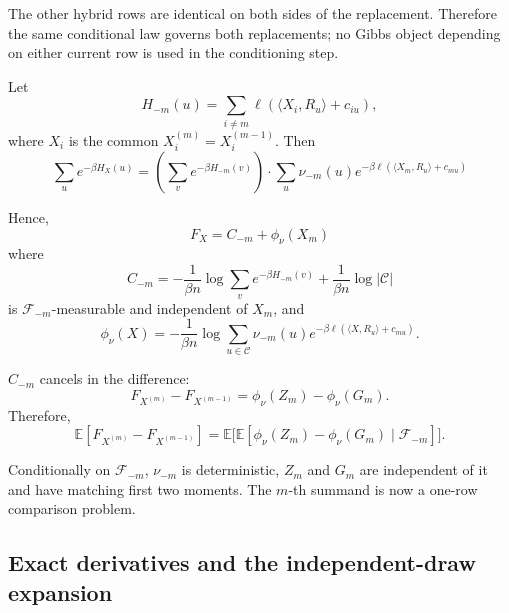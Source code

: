 \documentclass[11pt]{article}
\numberwithin{equation}{section}
\theoremstyle{definition}
\theoremstyle{remark}
\newcommand{\E}{\mathbb E}
\newcommand{\1}{\boldsymbol 1}
\begin{document}
\begin{aiblock}
The other hybrid rows are identical on both sides of the replacement. Therefore the same conditional law governs both replacements; no Gibbs object depending on either current row is used in the conditioning step.

Let
\[
    H_{-m}(u) = \sum_{i \ne m} \ell(\langle X_i, R_u \rangle + c_{iu}),
\]
where $X_i$ is the common $X_i^{(m)} = X_i^{(m - 1)}$.
Then
\[
    \sum_u e^{-\beta H_X(u)} = \left(\sum_v e^{-\beta H_{-m}(v)}\right) \cdot \sum_u \nu_{-m}(u) e^{-\beta\ell(\langle X_m, R_u \rangle + c_{mu})}
\]

Hence,
\[
    F_X = C_{-m} + \phi_{\nu}(X_m)
\]
where
\[
    C_{-m} = -\frac{1}{\beta n} \log\sum_v e^{-\beta H_{-m}(v)} + \frac{1}{\beta n} \log|\mathcal C|
\]
is $\mathcal F_{-m}$-measurable and independent of $X_m$, and
\[
    \phi_{\nu}(X) = -\frac{1}{\beta n} \log\sum_{u \in \mathcal C} \nu_{-m}(u) e^{-\beta\ell(\langle X, R_u \rangle + c_{mu})}.
\]

$C_{-m}$ cancels in the difference:
\[
    F_{X^{(m)}} - F_{X^{(m - 1)}} = \phi_{\nu}(Z_m) - \phi_{\nu}(G_m).
\]
Therefore,
\[
    \E[F_{X^{(m)}}-F_{X^{(m-1)}}] = \E\big[ \E[\phi_{\nu}(Z_m)-\phi_{\nu}(G_m)\mid\mathcal F_{-m}]\big].
\]

Conditionally on $\mathcal F_{-m}$, $\nu_{-m}$ is deterministic, $Z_m$ and $G_m$ are independent of it and have matching first two moments. The $m$-th summand is now a one-row comparison problem.

\subsection{Exact derivatives and the independent-draw expansion}\label{exact-derivatives-and-the-full-replica-expansion}


\end{aiblock}
\end{document}
